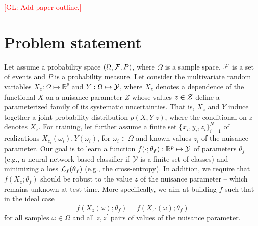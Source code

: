 \documentclass[twocolumn,superscriptaddress,aps]{revtex4-1}
\newcommand{\glnote}[1]{\textcolor{red}{[GL: #1]}}
\theoremstyle{plain}
\begin{document}
\glnote{Add paper outline.}


\section{Problem statement}
\label{sec:problem}

Let assume a probability space $(\Omega, {\cal F}, P)$, where $\Omega$ is a
sample space, ${\cal F}$ is a set of events and $P$ is a probability measure.
Let consider the multivariate random variables $X_z: \Omega \mapsto
\mathbb{R}^p$ and $Y: \Omega \mapsto {\cal Y}$, where $X_z$ denotes a dependence
of the functional $X$ on a nuisance parameter $Z$ whose values $z \in {\cal Z}$  define a
parameterized family of its systematic uncertainties. That is, $X_z$ and $Y$
induce together a joint probability distribution $p(X,Y|z)$, where the
conditional on $z$ denotes $X_z$. For training, let further assume a finite set $\{
x_i, y_i, z_i \}_{i=1}^N$ of realizations $X_{z_i}(\omega_i), Y(\omega_i)$, for
$\omega_i \in \Omega$ and known values $z_i$ of the nuisance parameter. Our goal
is to learn a function $f(\cdot;\theta_f) : \mathbb{R}^p \mapsto {\cal Y}$ of
parameters $\theta_f$ (e.g., a neural network-based classifier if ${\cal Y}$ is
a finite set of classes) and minimizing  a loss ${\cal L}_f(\theta_f)$ (e.g.,
the cross-entropy). In addition, we require that $f(X_z ; \theta_f)$ should be
robust to the value $z$ of the nuisance parameter  -- which remains unknown at
test time. More specifically, we aim at building $f$ such that in the ideal case
\begin{equation}\label{eqn:criterion-true}
f(X_{z}(\omega) ; \theta_f) = f(X_{z^\prime}(\omega) ; \theta_f)
\end{equation} for all
samples $\omega \in \Omega$ and all $z, z^\prime$ pairs of values of the
nuisance parameter.
\end{document}
